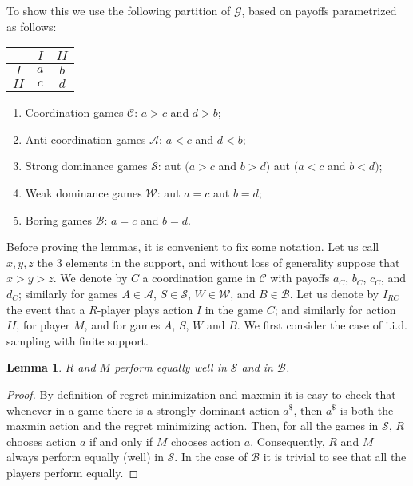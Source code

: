 \documentclass[fleqn,reqno,12pt]{article}
\theoremstyle{Satz}
\newtheorem{lemma}[theorem]{Lemma}
\theoremstyle{Bsp}
\begin{document}
\noindent To show this we use the following partition of $\mathcal{G}$, based on payoffs parametrized as
follows:
\begin{center}
  \begin{tabular}{ccc}
    \toprule
    & $I$ & $II$ \\ \midrule
    $I$ & $a$ & $b$ \\
    $II$ & $c$ & $d$ \\ \bottomrule
  \end{tabular}
\end{center}
\begin{enumerate}
\item Coordination games $\mathcal{C}$: $a>c$ and $d>b$;
\item Anti-coordination games $\mathcal{A}$: $a<c$ and $d<b$;
\item Strong dominance games $\mathcal{S}$: aut $(a>c$ and $b>d)$
aut $(a<c$ and $b<d)$;
\item Weak dominance games $\mathcal{W}$: aut $a=c$ aut $b=d$;
\item Boring games $\mathcal{B}$: $a=c$ and $b=d$.
\end{enumerate}
Before proving the lemmas, it is convenient to fix some notation. Let us call $x,y,z$ the 3
elements in the support, and without loss of generality suppose that $ x > y > z $.  We denote
by $C$ a coordination game in $\mathcal{C}$ with payoffs $a_{C}$, $b_{C}$, $c_{C}$, and
$d_{C}$; similarly for games $A \in \mathcal{A}$, $S \in \mathcal{S}$, $W \in \mathcal{W}$, and
$B \in \mathcal{B}$.  Let us denote by $I_{RC}$ the event that a $R$-player plays action $I$ in
the game $C$; and similarly for action $II$, for player $M$, and for games $A$, $S$, $W$ and
$B$. We first consider the case of i.i.d. sampling with finite support.

\begin{lemma} \label{lemma:S-B games} $R$ and $M$ perform equally well in $\mathcal{S}$ and in
  $\mathcal{B}$.
\end{lemma}

\begin{proof}
  By definition of regret minimization and maxmin it is easy to check that whenever in a game
  there is a strongly dominant action $a^{\$}$, then $a^{\$}$ is both the maxmin action and the
  regret minimizing action. Then, for all the games in $\mathcal{S}$, $R$ chooses action $a$ if
  and only if $M$ chooses action $a$. Consequently, $R$ and $M$ always perform equally (well)
  in $\mathcal{S}$. In the case of $\mathcal{B}$ it is trivial to see that all the players
  perform equally.
\end{proof}
\end{document}
